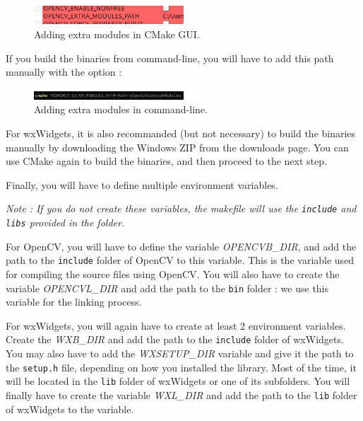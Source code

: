 \documentclass{article}
\begin{document}
\begin{figure}[H]
\centering
\includegraphics[width=0.5\textwidth]{cmake_gui_contrib.png}
\caption{\label{fig:cmake_gui_contrib}Adding extra modules in CMake GUI.}
\end{figure}

If you build the binaries from command-line, you will have to add this path manually with the option :

\begin{figure}[H]
\centering
\includegraphics[width=0.5\textwidth]{cmake_terminal_contrib.png}
\caption{\label{fig:cmake_terminal_contrib}Adding extra modules in command-line.}
\end{figure}

For wxWidgets, it is also recommanded (but not necessary) to build the binaries manually by downloading the Windows ZIP from the downloads page. You can use CMake again to build the binaries, and then proceed to the next step.\bigskip


Finally, you will have to define multiple environment variables.\bigskip

\textit{Note : If you do not create these variables, the makefile will use the \texttt{include} and \texttt{libs} provided in the folder.}

For OpenCV, you will have to define the variable \textit{OPENCVB\_DIR}, and add the path to the \texttt{include} folder of OpenCV to this variable. This is the variable used for compiling the source files using OpenCV. You will also have to create the variable \textit{OPENCVL\_DIR} and add the path to the \texttt{bin} folder : we use this variable for the linking process.\bigskip

For wxWidgets, you will again have to create at least 2 environment variables. Create the \textit{WXB\_DIR} and add the path to the \texttt{include} folder of wxWidgets. You may also have to add the \textit{WXSETUP\_DIR} variable and give it the path to the \texttt{setup.h} file, depending on how you installed the library. Most of the time, it will be located in the \texttt{lib} folder of wxWidgets or one of its subfolders. You will finally have to create the variable \textit{WXL\_DIR} and add the path to the \texttt{lib} folder of wxWidgets to the variable.\bigskip
\end{document}
